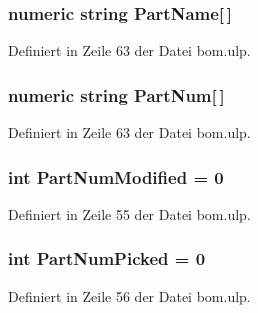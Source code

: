 \hypertarget{bom_8ulp_ac4cc860a9e71524e90eff241b475eee0}{}
\subsubsection[{Part\+Name}]{\setlength{\rightskip}{0pt plus 5cm}numeric string Part\+Name\mbox{[}$\,$\mbox{]}}\label{bom_8ulp_ac4cc860a9e71524e90eff241b475eee0}


Definiert in Zeile 63 der Datei bom.\+ulp.

\hypertarget{bom_8ulp_a84500c4914a36b14d9bf801dacd2bd27}{}
\subsubsection[{Part\+Num}]{\setlength{\rightskip}{0pt plus 5cm}numeric string Part\+Num\mbox{[}$\,$\mbox{]}}\label{bom_8ulp_a84500c4914a36b14d9bf801dacd2bd27}


Definiert in Zeile 63 der Datei bom.\+ulp.

\hypertarget{bom_8ulp_a2a39c78e48bddaa1377bf2fbec799590}{}
\subsubsection[{Part\+Num\+Modified}]{\setlength{\rightskip}{0pt plus 5cm}int Part\+Num\+Modified = 0}\label{bom_8ulp_a2a39c78e48bddaa1377bf2fbec799590}


Definiert in Zeile 55 der Datei bom.\+ulp.

\hypertarget{bom_8ulp_ad9f0da9a6c5a32a87ed13eb28d5453a6}{}
\subsubsection[{Part\+Num\+Picked}]{\setlength{\rightskip}{0pt plus 5cm}int Part\+Num\+Picked = 0}\label{bom_8ulp_ad9f0da9a6c5a32a87ed13eb28d5453a6}


Definiert in Zeile 56 der Datei bom.\+ulp.

\hypertarget{bom_8ulp_ab38dccbbc14320a5df859acfea65a3e6}{}
